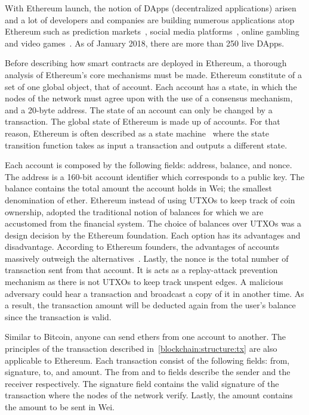 With Ethereum launch, the notion of DApps (decentralized applications) arisen
and a lot of developers and companies are building numerous applications atop Ethereum such as prediction markets~\cite{augur,gnosis}, social media platforms~\cite{akasha,backfeed},
online gambling~\cite{etheroll,coinpoker} and video games~\cite{cryptokitties}. As of January 2018, there are more than 250 live DApps.

Before describing how smart contracts are deployed in Ethereum, a thorough analysis of Ethereum's core mechanisms must be made. Ethereum constitute of a set of one global object, that of account. Each account has a state, in which the nodes of the network must agree upon with the use of a consensus mechanism, and a 20-byte address. The state of an account can only be changed by a transaction. The global state of Ethereum is made up of accounts. For that reason, Ethereum is often described as a state machine~\cite{ethereum_whitepaper} where the state transition function takes as input a transaction and outputs a different state.

Each account is composed by the following fields: address, balance, and nonce. The address is a 160-bit account identifier which corresponds to a public key. The balance contains the total amount the account holds in Wei; the smallest denomination of ether. Ethereum instead of using UTXOs to keep track of coin ownership, adopted the traditional notion of balances for which we are accustomed from the financial system. The choice of balances over UTXOs was a design decision by the Ethereum foundation. Each option has its advantages and disadvantage. According to Ethereum founders, the advantages of accounts massively outweigh the alternatives~\cite{eth_design}. Lastly, the nonce is the total number of transaction sent from that account. It is acts as a replay-attack prevention mechanism as there is not UTXOs to keep track unspent edges. A malicious adversary could hear a transaction and broadcast a copy of it in another time. As a result, the transaction amount will be deducted again from the user's balance since the transaction is valid.

Similar to Bitcoin, anyone can send ethers from one account to another. The principles of the transaction described in~\ref{blockchain:structure:tx} are also applicable to Ethereum. Each transaction consist of the following fields: from, signature, to, and amount. The from and to fields describe the sender and the receiver respectively. The signature field contains the valid signature of the transaction where the nodes of the network verify. Lastly, the amount contains the amount to be sent in Wei.


